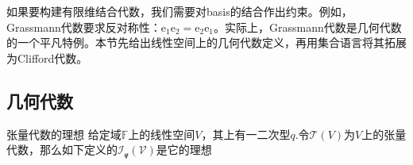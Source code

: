 
如果要构建有限维结合代数，我们需要对basis的结合作出约束。例如，Grassmann代数要求反对称性：$\mathrm {e_1e_2}=\mathrm {e_2e_1}$。实际上，Grassmann代数是几何代数的一个平凡特例。本节先给出线性空间上的几何代数定义，再用集合语言将其拓展为Clifford代数。
\subsection{几何代数}
\begin{theorem}{张量代数的理想}
给定域$\mathbb F$上的线性空间$V$，其上有一二次型$q$.令$\mathcal T(V)$为$V$上的张量代数，那么如下定义的$\mathcal {I_q(V)}$是它的理想
\end{theorem}
